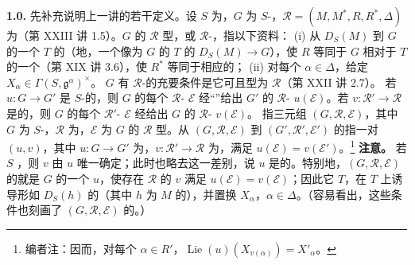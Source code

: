 \textbf{1.0.} 先补充说明上一讲的若干定义。设 $S$ 为，$G$ 为 $S$-，$\mathcal R=(M,M^*,R,R^*,\Delta)$ 为（第 XXIII 讲 1.5）。$G$ 的 $\mathcal R$ 型，或 $\mathcal R$-，指以下资料：
(i) 从 $D_S(M)$ 到 $G$ 的一个 $T$ 的（地，一个像为 $G$ 的 $T$ 的 $D_S(M)\to G$），使 $R$ 等同于 $G$ 相对于 $T$ 的一个（第 XIX 讲 3.6），使 $R^*$ 等同于相应的；
(ii) 对每个 $\alpha\in\Delta$，给定 $X_\alpha\in\Gamma(S,\mathfrak g^\alpha)^\times$。
$G$ 有 $\mathcal R$-的充要条件是它可且型为 $\mathcal R$（第 XXII 讲 2.7）。
若 $u:G\to G'$ 是 $S$-的，则 $G$ 的每个 $\mathcal R$- $\mathcal E$ 经“”给出 $G'$ 的 $\mathcal R$- $u(\mathcal E)$。若 $v:\mathcal R'\to\mathcal R$ 是的，则 $G$ 的每个 $\mathcal R'$- $\mathcal E$ 经给出 $G$ 的 $\mathcal R$- $v(\mathcal E)$。
指三元组 $(G,\mathcal R,\mathcal E)$，其中 $G$ 为 $S$-，$\mathcal R$ 为，$\mathcal E$ 为 $G$ 的 $\mathcal R$ 型。从 $(G,\mathcal R,\mathcal E)$ 到 $(G',\mathcal R',\mathcal E')$ 的指一对 $(u,v)$，其中 $u:G\to G'$ 为，$v:\mathcal R'\to\mathcal R$ 为，满足 $u(\mathcal E)=v(\mathcal E')$。\footnote[1]{编者注：因而，对每个 $\alpha\in R'$，$\operatorname{Lie}(u)(X_{v(\alpha)})=X'_\alpha$。}
\textbf{注意。} 若 $S$ ，则 $v$ 由 $u$ 唯一确定；此时也略去这一差别，说 $u$ 是的。特别地，$(G,\mathcal R,\mathcal E)$ 的就是 $G$ 的一个 $u$，使存在 $\mathcal R$ 的 $v$ 满足 $u(\mathcal E)=v(\mathcal E)$；因此它 $T$，在 $T$ 上诱导形如 $D_S(h)$ 的（其中 $h$ 为 $M$ 的），并置换 $X_\alpha$，$\alpha\in\Delta$。（容易看出，这些条件也刻画了 $(G,\mathcal R,\mathcal E)$ 的。）
